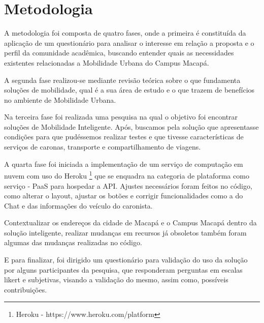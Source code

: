 %
%

\chapter{Metodologia}\label{chap:Metodologia} 
A metodologia foi composta de quatro fases, onde a primeira é constituída da aplicação de um questionário para analisar o interesse em relação a proposta e o perfil da comunidade acadêmica, buscando entender quais as necessidades existentes relacionadas a Mobilidade Urbana do Campus Macapá.%

A segunda fase realizou-se mediante revisão teórica sobre o que fundamenta soluções de mobilidade, qual é a sua área de estudo e o que trazem de benefícios no ambiente de Mobilidade Urbana.

Na terceira fase foi realizada uma pesquisa na qual o objetivo foi encontrar soluções de Mobilidade Inteligente. Após, buscamos pela solução que apresentasse condições para que pudéssemos realizar testes e que tivesse características de serviços de caronas, transporte e compartilhamento de viagens. 

A quarta fase foi iniciada a implementação de um serviço de computação em nuvem com uso do Heroku \footnote{Heroku - https://www.heroku.com/platform} que se enquadra na categoria de plataforma como serviço - PaaS para hospedar a API. Ajustes necessários foram feitos no código, como alterar o layout, ajustar os botões e corrigir funcionalidades como a do Chat e das informações do veículo do caronista. 

Contextualizar os endereços da cidade de Macapá e o Campus Macapá dentro da solução inteligente, realizar mudanças em recursos já obsoletos também foram algumas das mudanças realizadas no código.  

E para finalizar, foi dirigido um questionário para  validação do uso da solução por alguns participantes da pesquisa, que responderam perguntas em escalas likert e subjetivas, visando a validação do mesmo, assim como, possíveis contribuições. 


